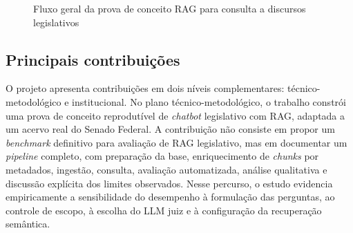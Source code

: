 \begin{figure}[ht]
\centering
{}
\caption{Fluxo geral da prova de conceito RAG para consulta a discursos legislativos}
\label{fig:pipeline-rag}
\end{figure}

\subsection{Principais contribuições}

O projeto apresenta contribuições em dois níveis complementares: técnico-metodológico e institucional. No plano técnico-metodológico, o trabalho constrói uma prova de conceito reprodutível de \textit{chatbot} legislativo com RAG, adaptada a um acervo real do Senado Federal. A contribuição não consiste em propor um \textit{benchmark} definitivo para avaliação de RAG legislativo, mas em documentar um \textit{pipeline} completo, com preparação da base, enriquecimento de \textit{chunks} por metadados, ingestão, consulta, avaliação automatizada, análise qualitativa e discussão explícita dos limites observados. Nesse percurso, o estudo evidencia empiricamente a sensibilidade do desempenho à formulação das perguntas, ao controle de escopo, à escolha do LLM juiz e à configuração da recuperação semântica.

